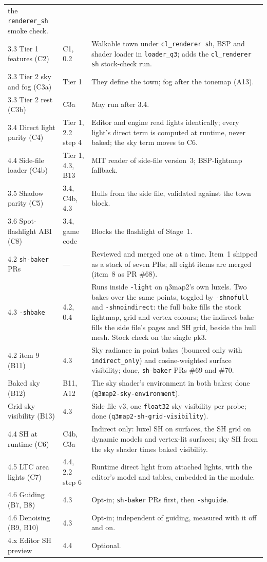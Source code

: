 \documentclass[11pt,a4paper]{article}
\begin{document}
\begin{longtable}{@{}llp{}@{}}
  the \texttt{renderer\_sh} smoke check. \\
3.3 Tier 1 features (C2) & C1, 0.2 & Walkable town under \texttt{cl\_renderer sh}, BSP and
  shader loader in \texttt{loader\_q3}; adds the \texttt{cl\_renderer sh} stock-check run. \\
3.3 Tier 2 sky and fog (C3a) & Tier 1 & They define the town; fog after the tonemap (A13). \\
3.3 Tier 2 rest (C3b) & C3a & May run after 3.4. \\
3.4 Direct light parity (C4) & Tier 1, 2.2 step 4 & Editor and engine read lights identically;
  every light's direct term is computed at runtime, never baked; the sky term moves to C6. \\
4.4 Side-file loader (C4b) & Tier 1, 4.3, B13 & MIT reader of side-file version~3; BSP-lightmap
  fallback. \\
3.5 Shadow parity (C5) & 3.4, C4b, 4.3 & Hulls from the side file, validated against the town
  block. \\
3.6 Spot-flashlight ABI (C8) & 3.4, game code & Blocks the flashlight of Stage~1. \\
4.2 \texttt{sh-baker} PRs & --- & Reviewed and merged one at a time. Item~1 shipped as a stack of
  seven PRs; all eight items are merged (item~8 as PR \#68). \\
4.3 \texttt{-shbake} & 4.2, 0.4 & Runs inside \texttt{-light} on q3map2's own luxels. Two bakes
  over the same points, toggled by \texttt{-shnofull} and \texttt{-shnoindirect}: the full bake
  fills the stock lightmap, grid and vertex colours; the indirect bake fills the side file's pages
  and SH grid, beside the hull mesh. Stock check on the single pk3. \\
4.2 item 9 (B11) & 4.3 & Sky radiance in point bakes (bounced only with \texttt{indirect\_only}) and
  cosine-weighted surface visibility; done, \texttt{sh-baker} PRs \#69 and \#70. \\
Baked sky (B12) & B11, A12 & The sky shader's environment in both bakes; done
  (\texttt{q3map2-sky-environment}). \\
Grid sky visibility (B13) & 4.3 & Side file v3, one \texttt{float32} sky visibility per probe; done
  (\texttt{q3map2-sh-grid-visibility}). \\
4.4 SH at runtime (C6) & C4b, C3a & Indirect only: luxel SH on surfaces, the SH grid on dynamic
  models and vertex-lit surfaces; sky SH from the sky shader times baked visibility. \\
4.5 LTC area lights (C7) & 4.4, 2.2 step 6 & Runtime direct light from attached lights, with the
  editor's model and tables, embedded in the module. \\
4.6 Guiding (B7, B8) & 4.3 & Opt-in; \texttt{sh-baker} PRs first, then \texttt{-shguide}. \\
4.6 Denoising (B9, B10) & 4.3 & Opt-in; independent of guiding, measured with it off and on. \\
4.x Editor SH preview & 4.4 & Optional. \\
\bottomrule
\end{longtable}
\end{document}
